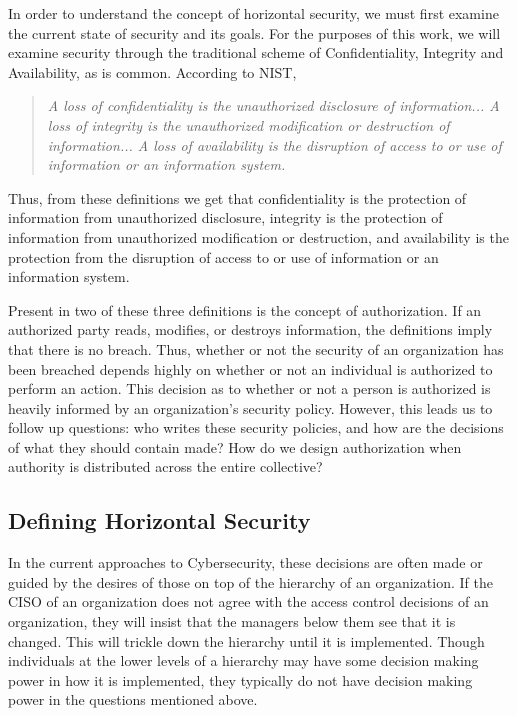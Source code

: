 In order to understand the concept of horizontal security, we must first examine
the current state of security and its goals. For the purposes of this work, we
will examine security through the traditional scheme of Confidentiality,
Integrity and Availability, as is common. According to NIST,

\begin{quotation}
\textit{A loss of confidentiality is the unauthorized disclosure of 
information... A loss of integrity is the unauthorized modification or
destruction of information... A loss of availability is the disruption of access
to or use of information or an information system.}~\cite{pub2004standards}
\end{quotation}

Thus, from these definitions we get that confidentiality is the protection of 
information from unauthorized disclosure, integrity is the protection of
information from unauthorized modification or destruction, and availability is
the protection from the disruption of access to or use of information or an
information system.

Present in two of these three definitions is the concept of authorization. If an
authorized party reads, modifies, or destroys information, the definitions imply
that there is no breach. Thus, whether or not the security of an organization has
been breached depends highly on whether or not an individual is authorized to
perform an action. This decision as to whether or not a person is authorized is
heavily informed by an organization's security policy. However, this leads us to
follow up questions: who writes these security policies, and how are the
decisions of what they should contain made? How do we design authorization when
authority is distributed across the entire collective?

\subsection{Defining Horizontal Security}
\label{sec:definition}

In the current approaches to Cybersecurity, these decisions are often made or
guided by the desires of those on top of the hierarchy of an organization. If
the CISO of an organization does not agree with the access control decisions of
an organization, they will insist that the managers below them see that it is
changed. This will trickle down the hierarchy until it is implemented. Though
individuals at the lower levels of a hierarchy may have some decision making
power in how it is implemented, they typically do not have decision making power
in the questions mentioned above. 

